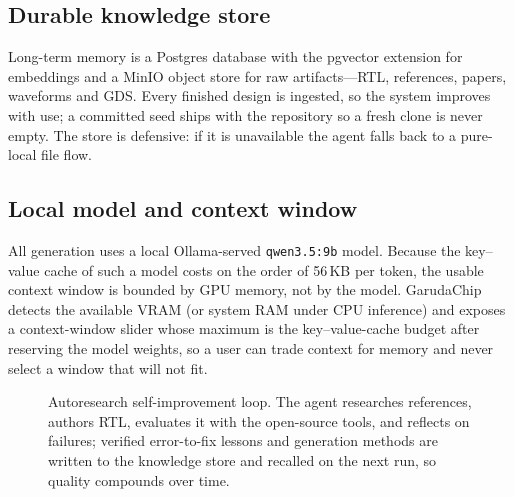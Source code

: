 \documentclass[conference]{IEEEtran}
\begin{document}
\subsection{Durable knowledge store}
Long-term memory is a Postgres database with the pgvector extension for
embeddings and a MinIO object store for raw artifacts---RTL, references, papers,
waveforms and GDS. Every finished design is ingested, so the system improves with
use; a committed seed ships with the repository so a fresh clone is never empty.
The store is defensive: if it is unavailable the agent falls back to a
pure-local file flow.

\subsection{Local model and context window}
All generation uses a local Ollama-served \texttt{qwen3.5:9b} model. Because the
key--value cache of such a model costs on the order of 56\,KB per token, the
usable context window is bounded by GPU memory, not by the model. GarudaChip
detects the available VRAM (or system RAM under CPU inference) and exposes a
context-window slider whose maximum is the key--value-cache budget after
reserving the model weights, so a user can trade context for memory and never
select a window that will not fit.

\begin{figure}[t]
\centering
{}
\caption{Autoresearch self-improvement loop. The agent researches references, authors RTL,
evaluates it with the open-source tools, and reflects on failures; verified error-to-fix
lessons and generation methods are written to the knowledge store and recalled on the next
run, so quality compounds over time.}
\label{fig:auto}
\end{figure}
\end{document}
